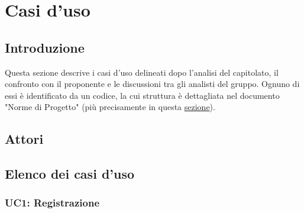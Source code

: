 \section{Casi d'uso}
\subsection{Introduzione}
Questa sezione descrive i casi d'uso delineati dopo l'analisi del capitolato, il confronto con il proponente e le discussioni tra gli analisti del gruppo. Ognuno di essi è identificato da un codice, la cui struttura è dettagliata nel documento "Norme di Progetto" (più precisamente in questa \href{www.google.com}{sezione}).

\subsection{Attori}

\subsection{Elenco dei casi d'uso}
\subsubsection{UC1: Registrazione}
